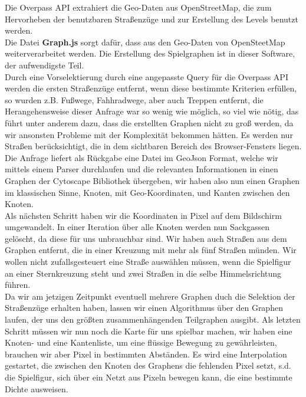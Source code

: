 \documentclass[11pt,a4paper]{article}
\begin{document}
Die Overpass API extrahiert die Geo-Daten aus OpenStreetMap, die zum Hervorheben der benutzbaren Straßenzüge und zur Erstellung des Levels benutzt werden.\\
Die Datei \textbf{Graph.js} sorgt dafür, dass aus den Geo-Daten von OpenSteetMap weiterverarbeitet werden.
Die Erstellung des Spielgraphen ist in dieser Software, der aufwendigste Teil. \\
Durch eine Vorselektierung durch eine angepasste Query für die Overpass API werden die ersten Straßenzüge entfernt, wenn diese bestimmte Kriterien erfüllen, so wurden z.B. Fußwege, Fahhradwege, aber auch Treppen entfernt, die Herangehensweise dieser Anfrage war \glqq so wenig wie möglich, so viel wie nötig\grqq, das führt unter anderem dazu, dass die erstellten Graphen nicht zu groß werden, da wir ansonsten Probleme mit der Komplexität bekommen hätten. Es werden nur Straßen berücksichtigt, die in dem sichtbaren Bereich des Browser-Fensters liegen.\\
Die Anfrage liefert als Rückgabe eine Datei im GeoJson Format, welche wir mittels einem Parser durchlaufen und die relevanten Informationen in einen Graphen der Cytoscape Bibliothek übergeben, wir haben also nun einen Graphen im klassischen Sinne, Knoten, mit Geo-Koordinaten, und Kanten zwischen den Knoten. \\
Als nächsten Schritt haben wir die Koordinaten in Pixel auf dem Bildschirm umgewandelt.
In einer Iteration über alle Knoten werden nun Sackgassen gelöscht, da diese für uns unbrauchbar sind.
Wir haben auch Straßen aus dem Graphen entfernt, die in einer Kreuzung mit mehr als fünf Straßen münden. Wir wollen nicht zufallsgesteuert eine Straße auswählen müssen, wenn die Spielfigur an einer Sternkreuzung steht und zwei Straßen in die selbe Himmelsrichtung führen. \\
Da wir am jetzigen Zeitpunkt eventuell mehrere Graphen duch die Selektion der Straßenzüge erhalten haben, lassen wir einen Algorithmus über den Graphen laufen, der uns den größten zusammenhängenden Teilgraphen ausgibt. 
Als letzten Schritt müssen wir nun noch die Karte für uns spielbar machen, wir haben eine Knoten- und eine Kantenliste, um eine flüssige Bewegung zu gewährleisten, brauchen wir aber Pixel in bestimmten Abständen.
Es wird eine Interpolation gestartet, die zwischen den Knoten des Graphens die fehlenden Pixel setzt, s.d. die Spielfigur, sich über ein Netzt aus Pixeln bewegen kann, die eine bestimmte Dichte ausweisen. 
\end{document}
